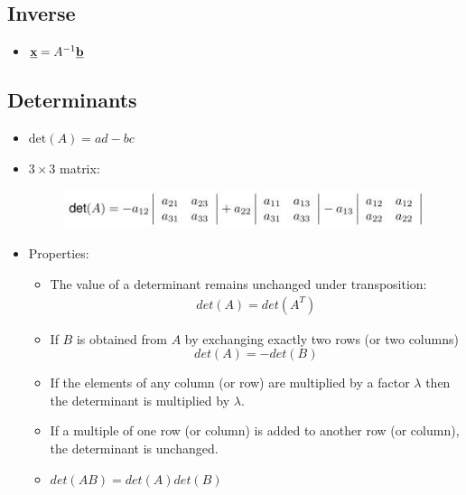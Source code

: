 \documentclass[10pt,a4paper]{article}
\begin{document}
\subsection{Inverse}

\begin{itemize}
    \item $\textbf{\underline{x}}=A^{-1}\textbf{\underline{b}}$
\end{itemize}

\subsection{Determinants}

\begin{itemize}
    \item $\text{det}(A) = ad-bc$
    \item $3\times 3$ matrix:
    \begin{figure} [h!]
        \centering
        \includegraphics[scale=0.9]{Capture.JPG}
    \end{figure}
    \item Properties:
    \begin{itemize}
        \item The value of a determinant remains unchanged under transposition:
        \begin{align*}
            det(A) = det(A^T)
        \end{align*}
        \item If $B$ is obtained from $A$ by exchanging exactly two rows (or two columns)
        $$det(A) = -det(B)$$
        \item If the elements of any column (or row) are multiplied by a factor $\lambda$ then the determinant is multiplied by $\lambda$.
        \item If a multiple of one row (or column) is added to another row (or column), the determinant is unchanged.
        \item $det(AB) =det(A)det(B)$
    \end{itemize}
\end{itemize}
















\end{document}
